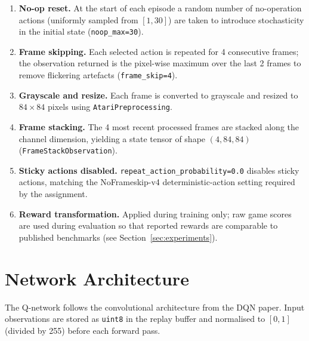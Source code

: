 \documentclass[11pt,a4paper]{article}
\begin{document}
\begin{enumerate}
  \item \textbf{No-op reset.}
        At the start of each episode a random number of no-operation
        actions (uniformly sampled from $[1, 30]$) are taken to introduce
        stochasticity in the initial state (\texttt{noop\_max=30}).
  \item \textbf{Frame skipping.}
        Each selected action is repeated for 4 consecutive frames; the
        observation returned is the pixel-wise maximum over the last 2
        frames to remove flickering artefacts (\texttt{frame\_skip=4}).
  \item \textbf{Grayscale and resize.}
        Each frame is converted to grayscale and resized to
        $84 \times 84$ pixels using \texttt{AtariPreprocessing}.
  \item \textbf{Frame stacking.}
        The 4 most recent processed frames are stacked along the channel
        dimension, yielding a state tensor of shape $(4, 84, 84)$
        (\texttt{FrameStackObservation}).
  \item \textbf{Sticky actions disabled.}
        \texttt{repeat\_action\_probability=0.0} disables sticky actions,
        matching the NoFrameskip-v4 deterministic-action setting required by
        the assignment.
  \item \textbf{Reward transformation.}
        Applied during training only; raw game scores are used during
        evaluation so that reported rewards are comparable to published
        benchmarks (see Section~\ref{sec:experiments}).
\end{enumerate}

\section{Network Architecture}

The Q-network follows the convolutional architecture from the DQN paper.
Input observations are stored as \texttt{uint8} in the replay buffer and
normalised to $[0,1]$ (divided by 255) before each forward pass.
\end{document}
